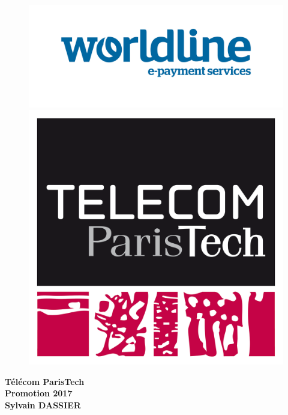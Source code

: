 \documentclass[a4paper,11pt]{article}
\begin{document}
	\sloppy
	\fontsize{12pt}{18pt}\selectfont
	\begin{figure}[htbp]
		\begin{minipage}[b]{0.5\linewidth}
			\centering
			\includegraphics[width=\linewidth]{pictures/worldline.jpg}
		\end{minipage}
		\hspace{3cm}
		\begin{minipage}[b]{0.25\linewidth}
			\centering
			\includegraphics[width=\linewidth]{pictures/telecom.png}
		\end{minipage}
	\end{figure}

	\begin{center}
	\textbf{\Large{Télécom ParisTech \\
			Promotion 2017 \\
			Sylvain DASSIER}}
	
	\end{center}
\end{document}
